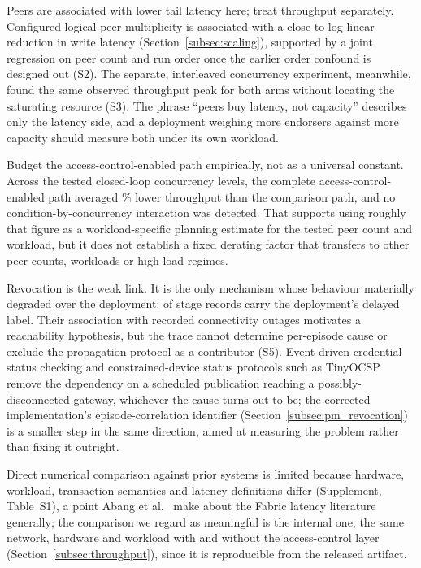 \documentclass[a4paper,fleqn]{cas-dc}
\begin{document}
Peers are associated with lower tail latency here; treat throughput
separately. Configured logical peer multiplicity is associated with a
close-to-log-linear reduction in write latency (Section~\ref{subsec:scaling}),
supported by a joint regression on peer count and run order once the
earlier order confound is designed out (S2). The separate, interleaved
concurrency experiment, meanwhile, found the same observed throughput peak
for both arms without locating the saturating resource (S3). The phrase
``peers buy latency, not capacity'' describes only the latency side, and a
deployment weighing more endorsers against more capacity should measure
both under its own workload.

Budget the access-control-enabled path empirically, not as a universal
constant. Across the tested closed-loop concurrency levels, the complete
access-control-enabled path averaged \OverheadMeanPct\% lower throughput
than the comparison path, and no condition-by-concurrency interaction was
detected. That supports using roughly that figure as a workload-specific
planning estimate for the tested peer count and workload, but it does not
establish a fixed derating factor that transfers to other peer counts,
workloads or high-load regimes.

Revocation is the weak link. It is the only mechanism whose behaviour
materially degraded over the deployment: \RevDelayed{} of \RevEvents{}
stage records carry the deployment's delayed label. Their association with
recorded connectivity outages motivates a reachability hypothesis, but the
trace cannot determine per-episode cause or exclude the propagation
protocol as a contributor (S5). Event-driven credential status checking
\cite{w3c_vc_status_list} and constrained-device status protocols such as
TinyOCSP \cite{fedrecheski2023tinyocsp} remove the dependency on a
scheduled publication reaching a possibly-disconnected gateway, whichever
the cause turns out to be; the corrected implementation's episode-correlation identifier
(Section~\ref{subsec:pm_revocation}) is a smaller step in the same
direction, aimed at measuring the problem rather than fixing it outright.

Direct numerical comparison against prior systems is limited because
hardware, workload, transaction semantics and latency definitions differ
(Supplement, Table~S1), a point
Abang et al.~\cite{abang2024latency} make about the Fabric latency
literature generally; the comparison we regard as meaningful is the
internal one, the same network, hardware and workload with and without
the access-control layer (Section~\ref{subsec:throughput}), since it is
reproducible from the released artifact.
\end{document}
